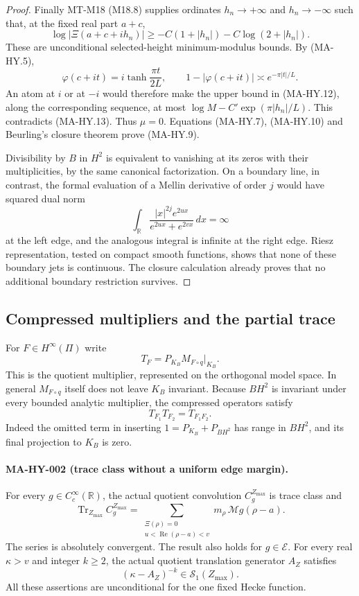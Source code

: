 \begin{proof}
Finally MT-M18 (M18.8) supplies ordinates $h_n\to+\infty$
and $h_n\to-\infty$ such that, at the fixed real part $a+c$,
\[
       \log|\Xi(a+c+ih_n)|
                 \ge -C(1+|h_n|)-C\log(2+|h_n|).
 \tag{MA-HY.13}
\]
These are unconditional selected-height minimum-modulus bounds.
By (MA-HY.5),
\[
       \varphi(c+it)=i\tanh\frac{\pi t}{2L},\qquad
       1-\left|\varphi(c+it)\right|
                    \asymp e^{-\pi|t|/L}.
\]
An atom at $i$ or at $-i$ would therefore make the upper
bound in (MA-HY.12), along the corresponding sequence,
at most $\log M-C'\exp(\pi|h_n|/L)$.  This contradicts
(MA-HY.13).  Thus $\mu=0$.  Equations (MA-HY.7),
(MA-HY.10) and Beurling's closure theorem prove (MA-HY.9).

Divisibility by $B$ in $H^2$ is equivalent to vanishing
at its zeros with their multiplicities, by the same
canonical factorization.  On a boundary line, in contrast,
the formal evaluation of a Mellin derivative of order $j$
would have squared dual norm
\[
    \int_{\mathbb R}
       \frac{|x|^{2j}e^{2ux}}{e^{2ux}+e^{2vx}}\,dx=\infty
\]
at the left edge, and the analogous integral is infinite
at the right edge.  Riesz representation, tested on compact
smooth functions, shows that none of these boundary jets
is continuous.  The closure calculation already proves that
no additional boundary restriction survives.
\end{proof}

\subsection{Compressed multipliers and the partial trace}

For $F\in H^\infty(\Pi)$ write
\[
       T_F=P_{K_B}M_{F\circ q}\big|_{K_B}.
 \tag{MA-HY.14}
\]
This is the quotient multiplier, represented on the orthogonal
model space.  In general $M_{F\circ q}$ itself does not leave
$K_B$ invariant.  Because $BH^2$ is invariant under every
bounded analytic multiplier, the compressed operators satisfy
\[
               T_{F_1}T_{F_2}=T_{F_1F_2}.
 \tag{MA-HY.15}
\]
Indeed the omitted term in inserting $1=P_{K_B}+P_{BH^2}$
has range in $BH^2$, and its final projection to $K_B$ is zero.

\paragraph{MA-HY-002 (trace class without a uniform edge margin).}
For every $g\in C_c^\infty(\mathbb R)$, the actual quotient
convolution $C_g^{Z_{\max}}$ is trace class and
\[
       \operatorname{Tr}_{Z_{\max}}C_g^{Z_{\max}}
       =\sum_{\substack{\Xi(\rho)=0\\
                  u<\operatorname{Re}(\rho-a)<v}}
                     m_\rho\,\mathcal Mg(\rho-a).
 \tag{MA-HY.16}
\]
The series is absolutely convergent.  The result also holds
for $g\in\mathcal E$.  For every real $\kappa>v$ and integer
$k\ge2$, the actual quotient translation generator $A_Z$
satisfies
\[
                    (\kappa-A_Z)^{-k}\in\mathcal S_1(Z_{\max}).
 \tag{MA-HY.17}
\]
All these assertions are unconditional for the one fixed
Hecke function.

